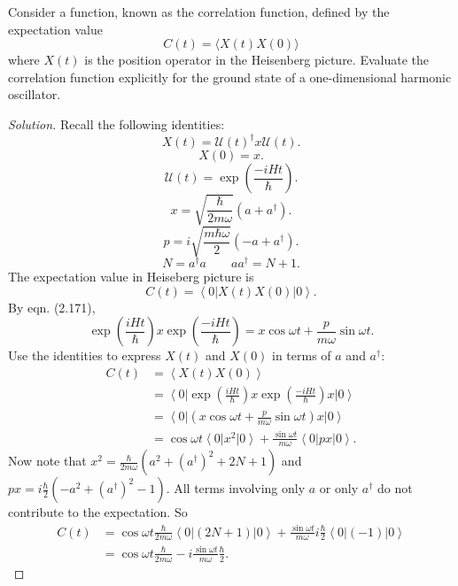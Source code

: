
\begin{problem}
	
Consider a function, known as the correlation function, defined by the expectation value
\[
C(t)=\langle X(t) X(0)\rangle
\]
where $X(t)$ is the position operator in the Heisenberg picture. Evaluate the correlation function explicitly for the ground state of a one-dimensional harmonic oscillator.
\end{problem}
\begin{proof}[Solution]
	Recall the following identities:
	\[
		X(t) = \mathcal{U}(t)^\dag x \mathcal{U}(t)
	.\] 
	\[
		X(0) = x
	.\] 
	\[
		\mathcal{U}(t) = \exp\left( \frac{-i H t}{\hbar} \right) 
	.\] 
	\[
		x = \sqrt{\frac{\hbar}{2 m \omega}}  (a + a^{\dag} )
	.\] 
	\[
		p = i \sqrt{\frac{m \hbar \omega}{2}} (- a + a^{\dag} )
	.\] 
	\[
		N = a^{\dag}  a \qquad a a^{\dag}  = N + 1
	.\] 
	The expectation value in Heiseberg picture is
	\[
		C(t) = \left\langle 0 \right| X(t) X(0) \left| 0 \right\rangle 
	.\] 
	By eqn. (2.171),
	\[
		\exp\left( \frac{i H t}{\hbar} \right) x \exp\left( \frac{- i H t}{\hbar} \right) 
		= x \cos \omega t + \frac{p}{m \omega} \sin \omega t
	.\] 
	Use the identities to express $X(t) $ and $X(0)$ in terms of $a$ and $a^{\dag} $:
	\begin{align*}
		C(t) &= \left\langle X(t) X(0) \right\rangle  \\
		&= \left\langle 0 \right| \exp\left( \frac{i H t}{\hbar} \right) x \exp\left( \frac{- i H t}{\hbar} \right) x \left| 0 \right\rangle  \\
		&= \left\langle 0 \right| \left( x \cos \omega t + \frac{p}{m \omega} \sin \omega t \right) x \left| 0 \right\rangle  \\
		&= \cos \omega t \left\langle 0 \right| x^2 \left| 0 \right\rangle + \frac{\sin \omega t}{m \omega} \left\langle 0 \right| p x \left| 0 \right\rangle 
	.\end{align*}
	Now note that $x^2 = \frac{\hbar}{2 m \omega}\left(a^2 + \left( a^{\dag}  \right) ^2 + 2 N + 1\right)$ and $px = i \frac{\hbar}{2}\left( -a^2 + (a^{\dag} )^2 - 1 \right) $. All terms involving only $a$ or only $a^{\dag} $ do not contribute to the expectation. So
	\begin{align*}
		C(t)
		&= \cos \omega t \frac{\hbar}{2 m \omega} \left\langle 0 \right| (2N+1) \left| 0 \right\rangle + \frac{\sin \omega t}{m \omega} i \frac{\hbar}{2} \left\langle 0 \right| (-1) \left| 0 \right\rangle  \\
		&= \cos \omega t \frac{\hbar}{2 m \omega} 
		- i\frac{\sin \omega t}{m \omega} \frac{\hbar}{2}
	.\end{align*}
\end{proof}


